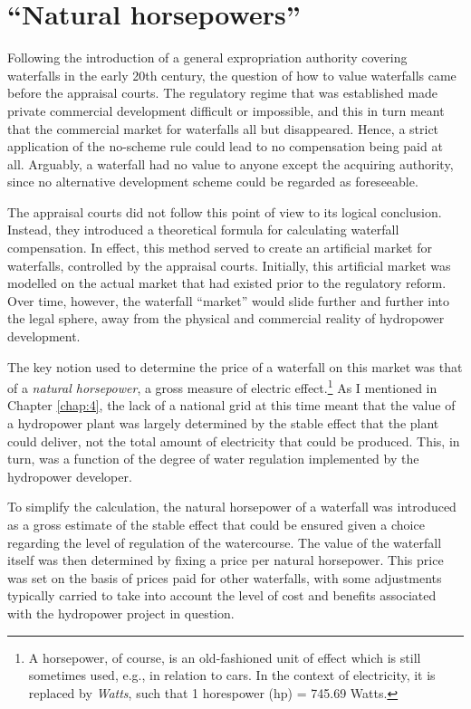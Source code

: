 \section{``Natural horsepowers''}

Following the introduction of a general expropriation authority covering waterfalls in the early 20th century,  the question of how to value waterfalls came before the appraisal courts. The regulatory regime that was established made private commercial development difficult or impossible, and this in turn meant that the commercial market for waterfalls all but disappeared. Hence, a strict application of the no-scheme rule could lead to no compensation being paid at all. Arguably, a waterfall had no value to anyone except the acquiring authority, since no alternative development scheme could be regarded as foreseeable.

The appraisal courts did not follow this point of view to its logical conclusion. Instead, they introduced a theoretical formula for calculating waterfall compensation. In effect, this method served to create an artificial market for waterfalls, controlled by the appraisal courts. Initially, this artificial market was modelled on the actual market that had existed prior to the regulatory reform. Over time, however, the waterfall ``market'' would slide further and further into the legal sphere, away from the physical and commercial reality of hydropower development.

The key notion used to determine the price of a waterfall on this market was that of a {\it natural horsepower}, a gross measure of electric effect.\footnote{A horsepower, of course, is an old-fashioned unit of effect which is still sometimes used, e.g., in relation to cars. In the context of electricity, it is replaced by {\it Watts}, such that 1 horespower (hp) = 745.69 Watts.} As I mentioned in Chapter \ref{chap:4}, the lack of a national grid at this time meant that the value of a hydropower plant was largely determined by the stable effect that the plant could deliver, not the total amount of electricity that could be produced. This, in turn, was a function of the degree of water regulation implemented by the hydropower developer. 

To simplify the calculation, the natural horsepower of a waterfall was introduced as a gross estimate of the stable effect that could be ensured given a choice regarding the level of regulation of the watercourse. The value of the waterfall itself was then determined by fixing a price per natural horsepower. This price was set on the basis of prices paid for other waterfalls, with some adjustments typically carried to take into account the level of cost and benefits associated with the hydropower project in question.

